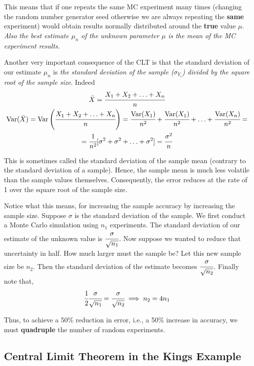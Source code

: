 This means that if one repeats the same MC experiment many times (changing the random number generator seed otherwise we are always repeating the \textbf{same} experiment) would obtain results normally distributed around the \textbf{true} value $\mu$. \emph{Also the best estimate $\mu_n$ of the unknown parameter $\mu$ is the mean of the MC experiment results.}

Another very important consequence of the CLT is that the standard deviation of our estimate $\mu_n$ is \emph{the standard deviation of the sample ($\sigma_{Y_i}$) divided by the square root of the sample size}. Indeed
\begin{equation*}
\begin{gathered}
\bar{X} = \cfrac{X_1 + X_2 +\ldots +X_n}{n}\\
\text{Var}(\bar{X}) = \text{Var}\left(\cfrac{X_1 + X_2 +\ldots +X_n}{n}\right)=\cfrac{\text{Var}(X_1)}{n^2}+\cfrac{\text{Var}(X_1)}{n^2}+\ldots+\cfrac{\text{Var}(X_n)}{n^2} = \\
=\cfrac{1}{n^2}[\sigma^2+\sigma^2+\ldots+\sigma^2] = \cfrac{\sigma^2}{n}
\end{gathered}
\end{equation*}

This is sometimes called the standard deviation of the sample mean (contrary to the standard deviation of a sample). Hence, the sample mean is much less volatile than the sample values themselves. Consequently, the error reduces at the rate of 1 over the square root of the sample size. 

Notice what this means, for increasing the sample accuracy by increasing the sample size. Suppose $\sigma$ is the standard deviation of the sample. We first conduct a Monte Carlo simulation using $n_1$ experiments. The standard deviation of our estimate of the unknown value is $\cfrac{\sigma}{\sqrt{n_1}}$. Now suppose we wanted to reduce that uncertainty in half. How much larger must the sample be? Let this new sample size be $n_2$. Then the standard deviation of the estimate becomes $\cfrac{\sigma}{\sqrt{n_2}}$.
Finally note that,
\begin{equation*}
  \cfrac{1}{2}\cfrac{\sigma}{\sqrt{n_1}}  = \cfrac{\sigma}{\sqrt{n_2}} \implies n_2 = 4 n_1
\end{equation*}

Thus, to achieve a 50\% reduction in error, i.e., a 50\% increase in accuracy, we must \textbf{quadruple} the number of random experiments.

\subsection{Central Limit Theorem in the Kings Example}

